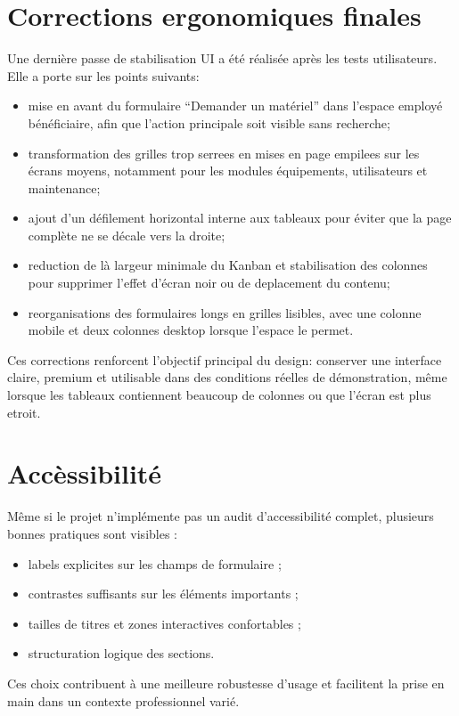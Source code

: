 ﻿\documentclass[12pt,a4paper,oneside]{report}
\begin{document}
\section{Corrections ergonomiques finales}
Une dernière passe de stabilisation UI a été réalisée après les tests utilisateurs. Elle a porte sur les points suivants:
\begin{itemize}
  \item mise en avant du formulaire \enquote{Demander un matériel} dans l'espace employé bénéficiaire, afin que l'action principale soit visible sans recherche;
  \item transformation des grilles trop serrees en mises en page empilees sur les écrans moyens, notamment pour les modules équipements, utilisateurs et maintenance;
  \item ajout d'un défilement horizontal interne aux tableaux pour éviter que la page complète ne se décale vers la droite;
  \item reduction de là largeur minimale du Kanban et stabilisation des colonnes pour supprimer l'effet d'écran noir ou de deplacement du contenu;
  \item reorganisations des formulaires longs en grilles lisibles, avec une colonne mobile et deux colonnes desktop lorsque l'espace le permet.
\end{itemize}

Ces corrections renforcent l'objectif principal du design: conserver une interface claire, premium et utilisable dans des conditions réelles de démonstration, même lorsque les tableaux contiennent beaucoup de colonnes ou que l'écran est plus etroit.

\section{Accèssibilité}
Même si le projet n'implémente pas un audit d'accessibilité complet, plusieurs bonnes pratiques sont visibles :
\begin{itemize}
  \item labels explicites sur les champs de formulaire ;
  \item contrastes suffisants sur les éléments importants ;
  \item tailles de titres et zones interactives confortables ;
  \item structuration logique des sections.
\end{itemize}

Ces choix contribuent à une meilleure robustesse d'usage et facilitent la prise en main dans un contexte professionnel varié.
\end{document}
